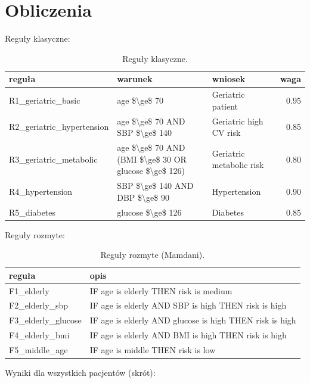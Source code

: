 \documentclass[12pt,a4paper]{article}
\begin{document}
\section{Obliczenia}
Reguły klasyczne:

\begin{table}[H]
\centering
\begin{tabular}{lllr}
\toprule
reguła & warunek & wniosek & waga \\
\midrule
R1\_geriatric\_basic & age \$\textbackslash ge\$ 70 & Geriatric patient & 0.95 \\
R2\_geriatric\_hypertension & age \$\textbackslash ge\$ 70 AND SBP \$\textbackslash ge\$ 140 & Geriatric high CV risk & 0.85 \\
R3\_geriatric\_metabolic & age \$\textbackslash ge\$ 70 AND (BMI \$\textbackslash ge\$ 30 OR glucose \$\textbackslash ge\$ 126) & Geriatric metabolic risk & 0.80 \\
R4\_hypertension & SBP \$\textbackslash ge\$ 140 AND DBP \$\textbackslash ge\$ 90 & Hypertension & 0.90 \\
R5\_diabetes & glucose \$\textbackslash ge\$ 126 & Diabetes & 0.85 \\
\bottomrule
\end{tabular}

\caption{Reguły klasyczne.}
\label{tab:crisp}
\end{table}

Reguły rozmyte:

\begin{table}[H]
\centering
\begin{tabular}{ll}
\toprule
reguła & opis \\
\midrule
F1\_elderly & IF age is elderly THEN risk is medium \\
F2\_elderly\_sbp & IF age is elderly AND SBP is high THEN risk is high \\
F3\_elderly\_glucose & IF age is elderly AND glucose is high THEN risk is high \\
F4\_elderly\_bmi & IF age is elderly AND BMI is high THEN risk is high \\
F5\_middle\_age & IF age is middle THEN risk is low \\
\bottomrule
\end{tabular}

\caption{Reguły rozmyte (Mamdani).}
\label{tab:fuzzy}
\end{table}

Wyniki dla wszystkich pacjentów (skrót):
\end{document}
